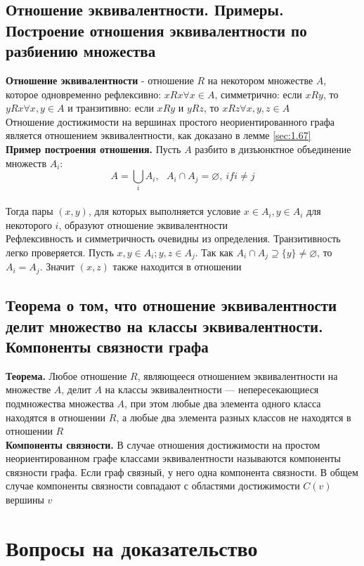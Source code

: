 \documentclass[a4paper]{article}
\begin{document}
\subsection{Отношение эквивалентности. Примеры. Построение отношения эквивалентности по разбиению множества}
\label{sec:1.68}\textbf{Отношение эквивалентности} - отношение $R$ на некотором множестве $A$, которое одновременно рефлексивно: $xRx\forall x\in A$, симметрично: если $xRy$, то $yRx\forall x,y\in A$ и транзитивно: если $xRy$ и $yRz$, то $xRz\forall x,y,z\in A$\\[2mm]
\indent Отношение достижимости на вершинах простого неориентированного графа является отношением эквивалентности, как доказано в лемме \ref{sec:1.67}\\[2mm]
\textbf{Пример построения отношения.} Пусть $A$ разбито в дизъюнктное объединение множеств $A_i$:
$$A=\bigcup_i A_i,\ \ \ A_i\cap A_j=\varnothing,\ if i\ne j$$\\[2mm]
\indent Тогда пары $(x,y)$, для которых выполняется условие $x\in A_i, y\in A_i$ для некоторого $i$, образуют отношение эквивалентности\\[2mm]
\indent Рефлексивность и симметричность очевидны из определения. Транзитивность легко проверяется. Пусть $x,y\in A_i; y,z\in A_j$. Так как $A_i \cap A_j\supseteq \{y\}\ne\varnothing$, то $A_i = A_j$. Значит $(x, z)$ также находится в отношении
\subsection{Теорема о том, что отношение эквивалентности делит множество на классы эквивалентности. Компоненты связности графа}
\label{sec:1.69}\textbf{Теорема.} Любое отношение $R$, являющееся отношением эквивалентности на множестве $A$, делит $A$ на классы эквивалентности — непересекающиеся подмножества множества $A$, при этом любые два элемента одного класса находятся в отношении $R$, а любые два элемента разных классов не находятся в отношении $R$\\[2mm]
\indent \textbf{Компоненты связности.} В случае отношения достижимости на простом неориентированном графе классами эквивалентности называются компоненты связности графа. Если граф связный, у него одна компонента связности. В общем случае компоненты связности совпадают с областями достижимости $C(v)$ вершины $v$
\newpage
\section{Вопросы на доказательство}
\end{document}

